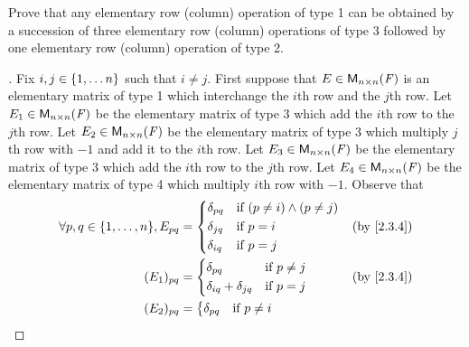 \begin{ex}\label{ex:3.1.9}
  Prove that any elementary row (column) operation of type 1 can be obtained by a succession of three elementary row (column) operations of type 3 followed by one elementary row (column) operation of type 2.
\end{ex}

\begin{proof}[]
  Fix \(i, j \in \left\lbrace1, \dots n\right\rbrace\) such that \(i \neq j\).
  First suppose that \(E \in \mathsf{M}_{{n} \times n}({\mathit{F}})\) is an elementary matrix of type 1 which interchange the \(i\)th row and the \(j\)th row.
  Let \(E_1 \in \mathsf{M}_{{n} \times n}({\mathit{F}})\) be the elementary matrix of type 3 which add the \(i\)th row to the \(j\)th row.
  Let \(E_2 \in \mathsf{M}_{{n} \times n}({\mathit{F}})\) be the elementary matrix of type 3 which multiply \(j\)th row with \(-1\) and add it to the \(i\)th row.
  Let \(E_3 \in \mathsf{M}_{{n} \times n}({\mathit{F}})\) be the elementary matrix of type 3 which add the \(i\)th row to the \(j\)th row.
  Let \(E_4 \in \mathsf{M}_{{n} \times n}({\mathit{F}})\) be the elementary matrix of type 4 which multiply \(i\)th row with \(-1\).
  Observe that
  \begin{align*}
    \forall p, q \in \set{1, \dots, n}, E_{p q} & = \begin{dcases}
                                                      \delta_{p q} & \text{if } (p \neq i) \land (p \neq j) \\
                                                      \delta_{j q} & \text{if } p = i                       \\
                                                      \delta_{i q} & \text{if } p = j
                                                    \end{dcases} &  & \text{(by \cref{2.3.4})}         \\
    (E_1)_{p q}                                 & = \begin{dcases}
                                                      \delta_{p q}                & \text{if } p \neq j \\
                                                      \delta_{i q} + \delta_{j q} & \text{if } p = j
                                                    \end{dcases}     &  & \text{(by \cref{2.3.4})}             \\
    (E_2)_{p q}                                 & = \begin{dcases}
                                                      \delta_{p q}                 & \text{if } p \neq i \\

\end{dcases}
\end{align*}
\end{proof}
